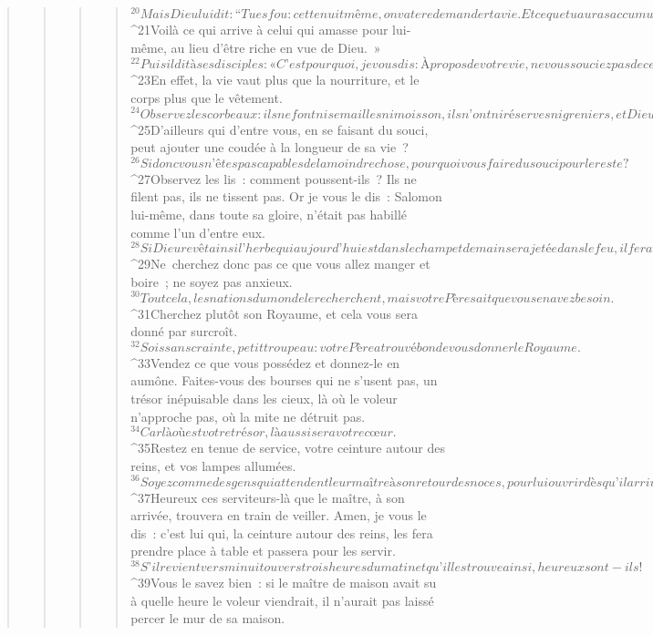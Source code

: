 \begin{verse}
\begin{verse}
\begin{verse}
\begin{verse}
${}^{20}Mais Dieu lui dit : “Tu es fou : cette nuit même, on va te redemander ta vie. Et ce que tu auras accumulé, qui l’aura ?” 
${}^{21}Voilà ce qui arrive à celui qui amasse pour lui-même, au lieu d’être riche en vue de Dieu. »
${}^{22}Puis il dit à ses disciples : « C’est pourquoi, je vous dis : À propos de votre vie, ne vous souciez pas de ce que vous mangerez, ni, à propos de votre corps, de quoi vous allez le vêtir. 
${}^{23}En effet, la vie vaut plus que la nourriture, et le corps plus que le vêtement. 
${}^{24}Observez les corbeaux : ils ne font ni semailles ni moisson, ils n’ont ni réserves ni greniers, et Dieu les nourrit. Vous valez tellement plus que les oiseaux ! 
${}^{25}D’ailleurs qui d’entre vous, en se faisant du souci, peut ajouter une coudée à la longueur de sa vie ? 
${}^{26}Si donc vous n’êtes pas capables de la moindre chose, pourquoi vous faire du souci pour le reste ? 
${}^{27}Observez les lis : comment poussent-ils ? Ils ne filent pas, ils ne tissent pas. Or je vous le dis : Salomon lui-même, dans toute sa gloire, n’était pas habillé comme l’un d’entre eux. 
${}^{28}Si Dieu revêt ainsi l’herbe qui aujourd’hui est dans le champ et demain sera jetée dans le feu, il fera tellement plus pour vous, hommes de peu de foi ! 
${}^{29}Ne cherchez donc pas ce que vous allez manger et boire ; ne soyez pas anxieux. 
${}^{30}Tout cela, les nations du monde le recherchent, mais votre Père sait que vous en avez besoin. 
${}^{31}Cherchez plutôt son Royaume, et cela vous sera donné par surcroît. 
${}^{32}Sois sans crainte, petit troupeau : votre Père a trouvé bon de vous donner le Royaume.
${}^{33}Vendez ce que vous possédez et donnez-le en aumône. Faites-vous des bourses qui ne s’usent pas, un trésor inépuisable dans les cieux, là où le voleur n’approche pas, où la mite ne détruit pas. 
${}^{34}Car là où est votre trésor, là aussi sera votre cœur.
${}^{35}Restez en tenue de service, votre ceinture autour des reins, et vos lampes allumées. 
${}^{36}Soyez comme des gens qui attendent leur maître à son retour des noces, pour lui ouvrir dès qu’il arrivera et frappera à la porte. 
${}^{37}Heureux ces serviteurs-là que le maître, à son arrivée, trouvera en train de veiller. Amen, je vous le dis : c’est lui qui, la ceinture autour des reins, les fera prendre place à table et passera pour les servir. 
${}^{38}S’il revient vers minuit ou vers trois heures du matin et qu’il les trouve ainsi, heureux sont-ils ! 
${}^{39}Vous le savez bien : si le maître de maison avait su à quelle heure le voleur viendrait, il n’aurait pas laissé percer le mur de sa maison. 

\end{verse}
\end{verse}
\end{verse}
\end{verse}
